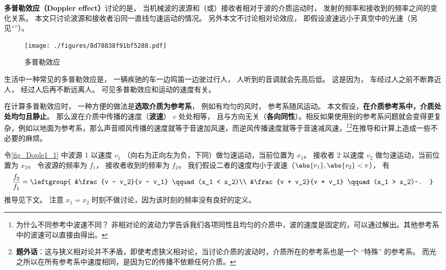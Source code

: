 

\textbf{多普勒效应（Doppler effect）}讨论的是， 当机械波的波源和（或）接收者相对于波的介质运动时， 发射的频率和接收到的频率之间的变化关系。 本文只讨论波源和接收者沿同一直线匀速运动的情况。 另外本文不讨论相对论效应， 即假设波速远小于真空中的光速（另见“”）。

\begin{figure}[ht]
\centering
\texttt{[image: ./figures/8d78838f91bf5288.pdf]}
\caption{多普勒效应} \label{fig_Dople1_1}
\end{figure}

\begin{example}{}
生活中一种常见的多普勒效应是， 一辆疾驰的车一边鸣笛一边驶过行人， 人听到的音调就会先高后低。 这是因为， 车经过人之前不断靠近人， 经过人后再不断远离人。 可见多普勒效应和运动的速度有关。
\end{example}

在计算多普勒效应时， 一种方便的做法是\textbf{选取介质为参考系}， 例如有均匀的风时， 参考系随风运动。 本文假设，\textbf{在介质参考系中，介质处处均匀且静止}。 那么波在介质中传播的速度（\textbf{波速}） $v$ 处处相等， 且与方向无关（\textbf{各向同性}）。相反如果使用别的参考系问题就会变得更复杂，例如以地面为参考系，那么声音顺风传播的速度就等于音速加风速，而逆风传播速度就等于音速减风速，\footnote{为什么不同参考中波速不同？ 非相对论的波动力学告诉我们各项同性且均匀的介质中，波的速度是固定的，可以通过解出。其他参考系中的波速可以直接由得出。 }\footnote{\textbf{题外话}：这与狭义相对论并不矛盾，即使考虑狭义相对论，当讨论介质的波动时，介质所在的参考系也是一个 “特殊” 的参考系。 而光之所以在所有参考系中速度相同，是因为它的传播不依赖任何介质。}在推导和计算上造成一些不必要的麻烦。

令\autoref{fig_Dople1_1} 中波源 1 以速度 $v_1$ （向右为正向左为负，下同）做匀速运动，当前位置为 $x_1$。 接收者 2 以速度 $v_2$ 做匀速运动，当前位置为 $x_2$。 令波源的频率为 $f_1$， 接收者收到的频率为 $f_2$。 我们假设二者的速度均小于波速（$\abs{v_1}, \abs{v_2} < v$）， 有
\begin{equation}\label{eq_Dople1_1}
\frac{f_2}{f_1} = \leftgroup{
&\frac{v - v_2}{v - v_1} \qquad (x_1 < x_2)\\
&\frac{v + v_2}{v + v_1} \qquad (x_1 > x_2)~.
}\end{equation}
推导见下文。 注意 $x_1=x_2$ 时刻不做讨论，因为该时刻的频率没有良好的定义。


